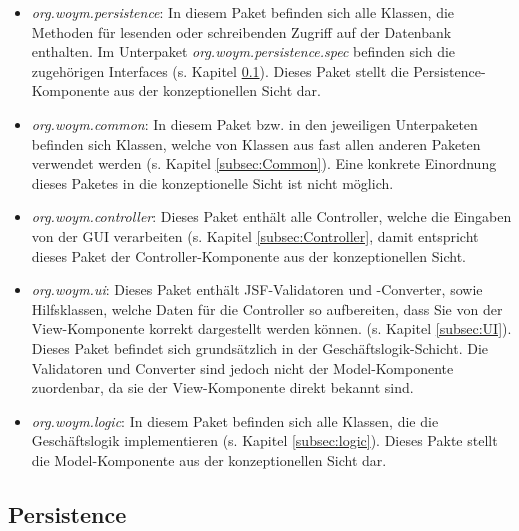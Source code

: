 \documentclass[fontsize=12pt,paper=a4,twoside]{scrartcl}
\begin{document}
\begin{itemize}
\item \textit{org.woym.persistence}: In diesem Paket befinden sich alle Klassen, die Methoden für lesenden oder schreibenden Zugriff auf der Datenbank enthalten. Im Unterpaket \textit{org.woym.persistence.spec} befinden sich die zugehörigen Interfaces (s. Kapitel \ref{subsec:persistence}). Dieses Paket stellt die Persistence-Komponente aus der konzeptionellen Sicht dar.
\item \textit{org.woym.common}: In diesem Paket  bzw. in den jeweiligen Unterpaketen befinden sich Klassen, welche von Klassen aus fast allen anderen Paketen verwendet werden (s. Kapitel \ref{subsec:Common}). Eine konkrete Einordnung dieses Paketes in die konzeptionelle Sicht ist nicht möglich. 
\item \textit{org.woym.controller}: Dieses Paket enthält alle Controller, welche die Eingaben von der GUI verarbeiten (s. Kapitel \ref{subsec:Controller}, damit entspricht dieses Paket der Controller-Komponente aus der konzeptionellen Sicht.
\item \textit{org.woym.ui}: Dieses Paket enthält JSF-Validatoren und -Converter, sowie Hilfsklassen, welche Daten für die Controller so aufbereiten, dass Sie von der View-Komponente korrekt dargestellt werden können. (s. Kapitel \ref{subsec:UI}). Dieses Paket befindet sich grundsätzlich in der Geschäftslogik-Schicht. Die Validatoren und Converter sind jedoch nicht der Model-Komponente zuordenbar, da sie der View-Komponente direkt bekannt sind. 
\item \textit{org.woym.logic}: In diesem Paket befinden sich alle Klassen, die die Geschäftslogik implementieren (s. Kapitel \ref{subsec:logic}). Dieses Pakte stellt die Model-Komponente aus der konzeptionellen Sicht dar.
\end{itemize}

\subsection{Persistence}
\label{subsec:persistence}
\end{document}
